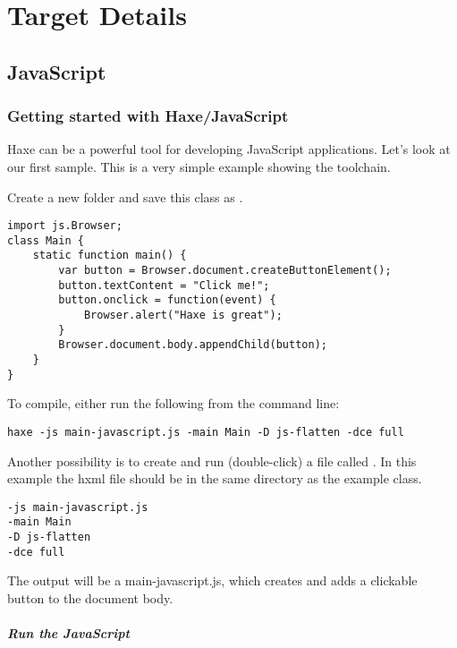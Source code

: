 \chapter{Target Details}
\label{target-details}

\section{JavaScript}
\label{target-javascript}

\subsection{Getting started with Haxe/JavaScript}
\label{target-javascript-getting-started}

Haxe can be a powerful tool for developing JavaScript applications. Let's look at our first sample.
This is a very simple example showing the toolchain.

Create a new folder and save this class as .

\begin{lstlisting}
import js.Browser;
class Main {
    static function main() {
        var button = Browser.document.createButtonElement();
        button.textContent = "Click me!";
        button.onclick = function(event) {
            Browser.alert("Haxe is great");
        }
        Browser.document.body.appendChild(button);
    }
}
\end{lstlisting}

To compile, either run the following from the command line:

\begin{lstlisting}
haxe -js main-javascript.js -main Main -D js-flatten -dce full
\end{lstlisting}

Another possibility is to create and run (double-click) a file called . In this example the hxml file should be in the same directory as the example class.

\begin{lstlisting}
-js main-javascript.js
-main Main
-D js-flatten
-dce full
\end{lstlisting}

The output will be a main-javascript.js, which creates and adds a clickable button to the document body.

\paragraph{Run the JavaScript}

